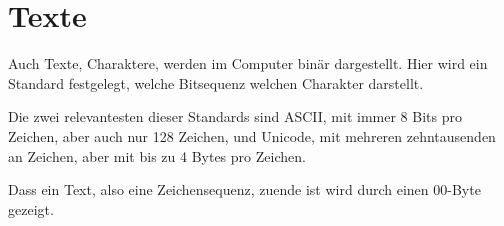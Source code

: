 \documentclass{article}
\begin{document}
\section{Texte} 
Auch Texte, Charaktere, werden im Computer binär dargestellt. Hier wird ein Standard festgelegt, welche Bitsequenz welchen Charakter darstellt.

Die zwei relevantesten dieser Standards sind ASCII, mit immer 8 Bits pro Zeichen, aber auch nur 128 Zeichen, und Unicode, mit mehreren zehntausenden an Zeichen, aber mit bis zu 4 Bytes pro Zeichen.

Dass ein Text, also eine Zeichensequenz, zuende ist wird durch einen 00\bh-Byte gezeigt.
\end{document}
